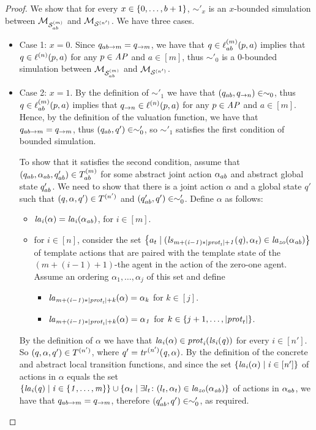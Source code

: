 \begin{proof}
We show that for every $x \in \left \{ 0, \ldots, b+1 \right \}$, $\sim'_x$ is an $x$-bounded
simulation between $\mathcal{M}_{\mathcal{S}_{ab}^{(m)}}$ and $\mathcal{M}_{\mathcal{S}^{(n')}}$. We have three cases.

\begin{itemize}
  \item Case 1: $x=0$.  Since  $q_{ab \rightarrow m} = q_{\rightarrow m}$, we have that
  $q \in \ell^{(m)}_{ab}(p, a)$ implies that $q \in \ell^{(n)} (p, a)$ for any
  $p \in \it{AP}$ and $a \in [m]$, thus $\sim'_0$ is a $0$-bounded simulation
  between $\mathcal{M}_{\mathcal{S}_{ab}^{(m)}}$ and $\mathcal{M}_{\mathcal{S}^{(n')}}$.


  \item Case 2: $x = 1$.  By the definition of $\sim'_1$ we have
  that $(q_{ab}, q_{\rightarrow n}) \in \sim_{0}$, 
  thus  $q \in \ell^{(m)}_{ab}(p, a)$ implies that $q_{\rightarrow n} \in
  \ell^{(n)} (p, a)$ for any $p \in \it{AP}$ and $a \in [m]$. Hence, by the
  definition of the valuation function, we have that $q_{ab \rightarrow m} =
  q_{\rightarrow m}$, thus $(q_{ab}, q') \in \sim'_0$, so $\sim'_1$
  satisfies the first condition of bounded simulation. 


  To show that it satisfies the second condition, assume that $(q_{ab},
  \alpha_{ab}, q_{ab}') \in T^{(m)}_{ab}$ for some abstract joint action
  $\alpha_{ab}$ and abstract global state $q_{ab}'$. We need to show that there
  is a joint action $\alpha$ and a  global state $q'$ such that $(q, \alpha, q')
  \in T^{(n')}$ and $(q_{ab}', q') \in \sim'_0$. Define $\alpha$ as
  follows:

  \begin{itemize}
    \item $\it{la}_{i}({\alpha}) = \it{la}_{i}({\alpha_{ab}})$, for $i \in [m]$.
    \item  for $i \in [n]$, consider the set $\left \{ a_t \mid (\it{ls}_{m + (i - 1) *
    |\mathit{prot}_{t}| + 1}(q),\alpha_t) \in \it{la}_{zo}({\alpha_{ab}}) \right \}$ of template actions
    that are paired with the template state of the $(m + (i-1) + 1)$-the agent
    in the action of the zero-one agent. Assume an ordering $\alpha_1, \ldots,
    \alpha_j$ of this set and define
    \begin{itemize}
    \item  $\it{la}_{m + (i -1) * |\mathit{prot}_{t}| + k}({\alpha}) = \alpha_k$  for $k \in [j]$.
    \item $\it{la}_{m + (i-1) * |\mathit{prot}_{t}| + k}({\alpha}) = \alpha_1$ for $k \in
    \left \{ j+1, \ldots, |\mathit{prot}_{t}| \right \}$.
    \end{itemize}
  \end{itemize}
  By the definition of $\alpha$ we have that $\it{la}_{i}({\alpha}) \in \mathit{prot}_{i}(\it{ls}_{i}(q))$ for every $i \in [n']$. So $(q, \alpha, q') \in T^{(n')}$, where $q' = \it{tr}^{(n')} (q, \alpha)$. By the definition of the
  concrete and abstract local transition functions, and since the set
  $\left \{ \it{la}_{i}({\alpha}) \mid i \in [n'] \right \}$ of actions in $\alpha$ equals the set
  $\left \{ \it{la}_{i}({q}) \mid i \in \left \{ 1,\ldots,m \right \} \right \} \cup \left \{ \alpha_t \mid \exists
  l_t \colon (l_t, \alpha_t) \in \it{la}_{zo}({\alpha_{ab}}) \right \}$ of actions in $\alpha_{ab}$,
  we have that $q_{ab \rightarrow m} = q_{\rightarrow m}$, therefore
  $(q_{ab}', q') \in \sim'_0$, as required. 



\end{itemize}
\end{proof}
